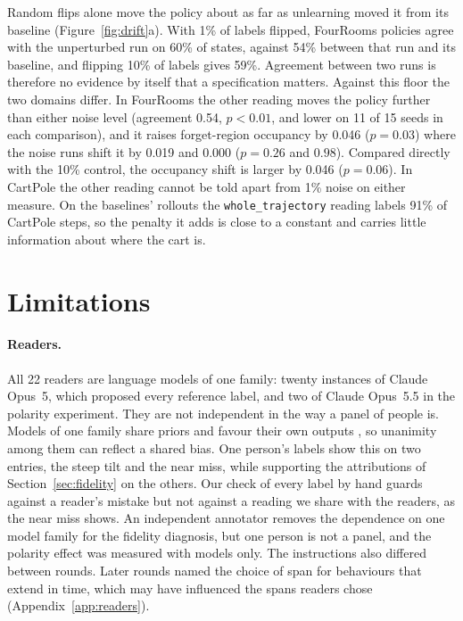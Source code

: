 \documentclass{article}
\begin{document}
Random flips alone move the policy about as far as unlearning moved it
from its baseline (Figure~\ref{fig:drift}a). With 1\% of labels flipped,
FourRooms policies agree with the unperturbed run on 60\% of states,
against 54\% between that run and its baseline, and flipping 10\% of
labels gives 59\%. Agreement between two runs is therefore no
evidence by itself that a specification matters. Against this floor the
two domains differ. In FourRooms the other reading moves the policy
further than either noise level (agreement 0.54, $p<0.01$, and lower on
11 of 15 seeds in each comparison), and it raises forget-region occupancy
by 0.046 ($p=0.03$) where the noise runs shift it by 0.019 and 0.000
($p=0.26$ and $0.98$). Compared directly with the 10\% control, the
occupancy shift is larger by 0.046 ($p=0.06$). In CartPole the other reading cannot
be told apart from 1\% noise on either measure. On the baselines'
rollouts the \texttt{whole\_trajectory} reading labels 91\% of CartPole
steps, so the penalty it adds is close to a constant and carries little
information about where the cart is.

\section{Limitations}
\label{sec:limitations}

\paragraph{Readers.} All 22 readers are language models of one family:
twenty instances of Claude Opus~5, which proposed every reference label,
and two of Claude Opus~5.5 in the polarity experiment. They are not
independent in
the way a panel of people is. Models of one family share priors and
favour their own outputs \citep{panickssery2024llm}, so unanimity among
them can reflect a shared bias. One person's labels show this on two
entries, the steep tilt and the near miss, while supporting the
attributions of Section~\ref{sec:fidelity} on the others. Our check of
every label by hand guards against a reader's mistake but not against a
reading we share with the readers, as the near miss shows. An independent
annotator removes the dependence on one model family for the fidelity
diagnosis, but one person is not a panel, and the polarity effect was
measured with models only. The
instructions also differed between rounds. Later rounds named the choice
of span for behaviours that extend in time, which may have influenced the
spans readers chose (Appendix~\ref{app:readers}).
\end{document}
